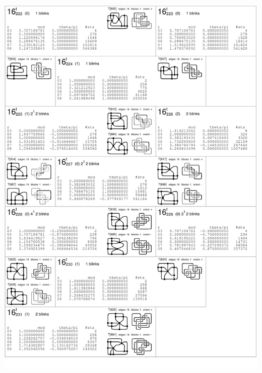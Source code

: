 \begin{center}
 \includegraphics[height=23.5cm]{E.figsbw2/con3catalog037_bw.pdf} \eject

\end{center}
